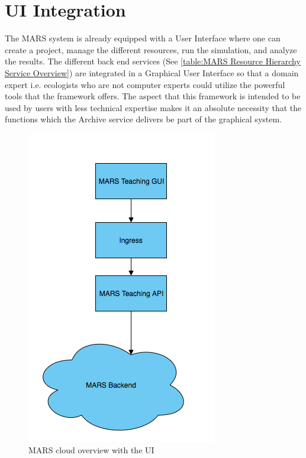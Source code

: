 \section{UI Integration}
The MARS system is already equipped with a User Interface where one can create a project, manage the different resources, run the simulation, and
analyze the results. The different back end services (See \ref{table:MARS Resource Hierarchy Service Overview}) are integrated in a Graphical
User Interface so that a domain expert i.e. ecologists who are not computer experts could utilize the powerful tools that the framework offers.
The aspect that this framework is intended to be used by users with less technical expertise makes it an absolute necessity that
the functions which the Archive service delivers be part of the graphical system.

\begin{figure}[H]
    \centering \includegraphics[scale=0.6]{grafiken/marsIngress.png}
    \caption{MARS cloud overview with the UI}
    \label{fig:marsCloudUI}
\end{figure}

